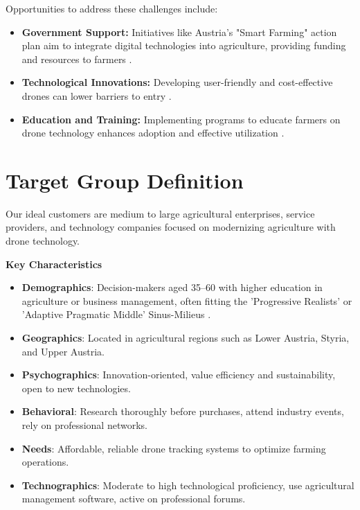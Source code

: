 Opportunities to address these challenges include:

\begin{itemize} \item \textbf{Government Support:} Initiatives like Austria's "Smart Farming" action plan aim to integrate digital technologies into agriculture, providing funding and resources to farmers \citep{smartfarming2023}. \item \textbf{Technological Innovations:} Developing user-friendly and cost-effective drones can lower barriers to entry \citep{guardianagriculture}. \item \textbf{Education and Training:} Implementing programs to educate farmers on drone technology enhances adoption and effective utilization \citep{nazarov2023}. \end{itemize}

\section{Target Group Definition}

Our ideal customers are medium to large agricultural enterprises, service providers, and technology companies focused on modernizing agriculture with drone technology.

\textbf{Key Characteristics}

\begin{itemize} \item \textbf{Demographics}: Decision-makers aged 35--60 with higher education in agriculture or business management, often fitting the 'Progressive Realists' or 'Adaptive Pragmatic Middle' Sinus-Milieus \cite{sinus_institut_2024}. \item \textbf{Geographics}: Located in agricultural regions such as Lower Austria, Styria, and Upper Austria. \item \textbf{Psychographics}: Innovation-oriented, value efficiency and sustainability, open to new technologies. \item \textbf{Behavioral}: Research thoroughly before purchases, attend industry events, rely on professional networks. \item \textbf{Needs}: Affordable, reliable drone tracking systems to optimize farming operations. \item \textbf{Technographics}: Moderate to high technological proficiency, use agricultural management software, active on professional forums. \end{itemize}

